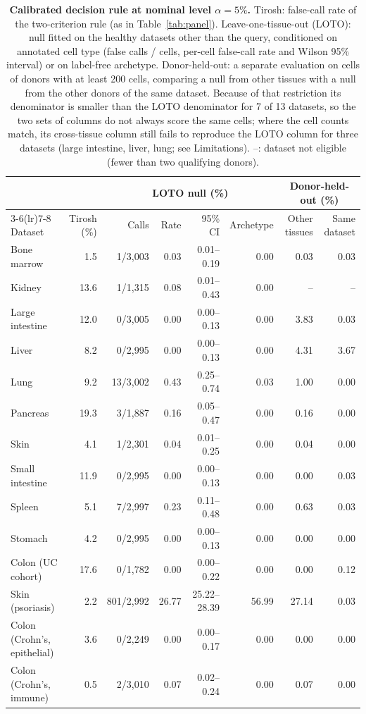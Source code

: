 \begin{table}[htbp]
\centering
\caption{\textbf{Calibrated decision rule at nominal level $\alpha = 5\%$.} Tirosh: false-call rate of the two-criterion rule (as in Table~\ref{tab:panel}). Leave-one-tissue-out (LOTO): null fitted on the healthy datasets other than the query, conditioned on annotated cell type (false calls / cells, per-cell false-call rate and Wilson 95\% interval) or on label-free archetype. Donor-held-out: a separate evaluation on cells of donors with at least 200 cells, comparing a null from other tissues with a null from the other donors of the same dataset. Because of that restriction its denominator is smaller than the LOTO denominator for 7 of 13 datasets, so the two sets of columns do not always score the same cells; where the cell counts match, its cross-tissue column still fails to reproduce the LOTO column for three datasets (large intestine, liver, lung; see Limitations). --: dataset not eligible (fewer than two qualifying donors).}
\label{tab:cal}
\scriptsize
\setlength{\tabcolsep}{3.5pt}
\begin{tabular}{@{}lrrrrrrr@{}}
\toprule
 & & \multicolumn{4}{c}{LOTO null (\%)} & \multicolumn{2}{c}{Donor-held-out (\%)} \\
\cmidrule(lr){3-6}\cmidrule(lr){7-8}
Dataset & Tirosh (\%) & Calls & Rate & 95\% CI & Archetype & Other tissues & Same dataset \\
\midrule
Bone marrow & 1.5 & 1/3,003 & 0.03 & 0.01--0.19 & 0.00 & 0.03 & 0.03 \\
Kidney & 13.6 & 1/1,315 & 0.08 & 0.01--0.43 & 0.00 & -- & -- \\
Large intestine & 12.0 & 0/3,005 & 0.00 & 0.00--0.13 & 0.00 & 3.83 & 0.03 \\
Liver & 8.2 & 0/2,995 & 0.00 & 0.00--0.13 & 0.00 & 4.31 & 3.67 \\
Lung & 9.2 & 13/3,002 & 0.43 & 0.25--0.74 & 0.03 & 1.00 & 0.00 \\
Pancreas & 19.3 & 3/1,887 & 0.16 & 0.05--0.47 & 0.00 & 0.16 & 0.00 \\
Skin & 4.1 & 1/2,301 & 0.04 & 0.01--0.25 & 0.00 & 0.04 & 0.00 \\
Small intestine & 11.9 & 0/2,995 & 0.00 & 0.00--0.13 & 0.00 & 0.00 & 0.03 \\
Spleen & 5.1 & 7/2,997 & 0.23 & 0.11--0.48 & 0.00 & 0.63 & 0.03 \\
Stomach & 4.2 & 0/2,995 & 0.00 & 0.00--0.13 & 0.00 & 0.00 & 0.00 \\
\midrule
Colon (UC cohort) & 17.6 & 0/1,782 & 0.00 & 0.00--0.22 & 0.00 & 0.00 & 0.12 \\
Skin (psoriasis) & 2.2 & 801/2,992 & 26.77 & 25.22--28.39 & 56.99 & 27.14 & 0.03 \\
Colon (Crohn's, epithelial) & 3.6 & 0/2,249 & 0.00 & 0.00--0.17 & 0.00 & 0.00 & 0.00 \\
Colon (Crohn's, immune) & 0.5 & 2/3,010 & 0.07 & 0.02--0.24 & 0.00 & 0.07 & 0.00 \\
\bottomrule
\end{tabular}
\end{table}
